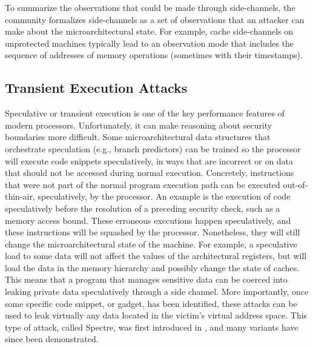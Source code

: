 To summarize the observations that could be made through side-channels, the community formalizes side-channels as a set of observations that an attacker can make about the microarchitectural state. 
For example, cache side-channels on unprotected machines typically lead to an observation mode that includes the sequence of addresses of memory operations (sometimes with their timestamps).%

\subsection{Transient Execution Attacks}
\label{sec:specandside}

Speculative or transient execution is one of the key performance features of modern processors.
Unfortunately, it can make reasoning about security boundaries more difficult.
Some microarchitectural data structures that orchestrate speculation (e.g., branch predictors) can be trained so the processor will execute code snippets speculatively, in ways that are incorrect or on data that should not be accessed during normal execution.
Concretely, instructions that were not part of the normal program execution path can be executed out-of-thin-air, speculatively, by the processor.
An example is the execution of code speculatively before the resolution of a preceding security check, such as a memory access bound.
These erroneous executions happen speculatively, and these instructions will be squashed by the processor.
Nonetheless, they will still change the microarchitectural state of the machine.
For example, a speculative load to some data will not affect the values of the architectural registers, but will load the data in the memory hierarchy and possibly change the state of caches.
This means that a program that manages sensitive data can be coerced into leaking private data speculatively through a side channel.
More importantly, once some specific code snippet, or gadget, has been identified, these attacks can be used to leak virtually any data located in the victim's virtual address space.
This type of attack, called Spectre, was first introduced in \cite{Kocher2018spectre}, and many variants have since been demonstrated.

